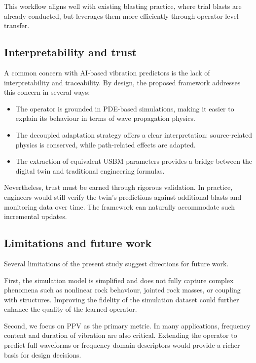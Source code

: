 \documentclass[a4paper,fleqn]{cas-sc}
\begin{document}
This workflow aligns well with existing blasting practice,
where trial blasts are already conducted,
but leverages them more efficiently through operator-level transfer.

\subsection{Interpretability and trust}

A common concern with AI-based vibration predictors
is the lack of interpretability and traceability.
By design, the proposed framework addresses this concern in several ways:
\begin{itemize}
  \item The operator is grounded in PDE-based simulations,
        making it easier to explain its behaviour in terms of wave propagation physics.
  \item The decoupled adaptation strategy offers a clear interpretation:
        source-related physics is conserved, while path-related effects are adapted.
  \item The extraction of equivalent USBM parameters
        provides a bridge between the digital twin and traditional engineering formulas.
\end{itemize}

Nevertheless, trust must be earned through rigorous validation.
In practice, engineers would still verify the twin's predictions
against additional blasts and monitoring data over time.
The framework can naturally accommodate such incremental updates.

\subsection{Limitations and future work}

Several limitations of the present study suggest directions for future work.

First, the simulation model is simplified and does not fully capture
complex phenomena such as nonlinear rock behaviour,
jointed rock masses, or coupling with structures.
Improving the fidelity of the simulation dataset
could further enhance the quality of the learned operator.

Second, we focus on PPV as the primary metric.
In many applications, frequency content and duration of vibration
are also critical.
Extending the operator to predict full waveforms
or frequency-domain descriptors would provide a richer basis
for design decisions.
\end{document}
